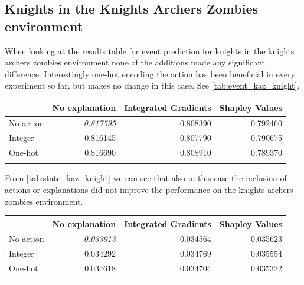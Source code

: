 \documentclass[UKenglish]{uiomasterthesis}
\begin{document}
\subsection{Knights in the Knights Archers Zombies environment}

When looking at the results table for event prediction for knights in the knights archers zombies environment none of the additions made any significant difference. Interestingly one-hot encoding the action has been beneficial in every experiment so far, but makes no change in this case. See \cref{tab:event_kaz_knight}.

\begin{center}
\label{tab:event_kaz_knight}
\begin{tabular}{lrrr}
\toprule
 & No explanation & Integrated Gradients & Shapley Values \\
\midrule
No action & \textit{0.817595} & 0.808390 & 0.792460 \\
Integer & 0.816145 & 0.807790 & 0.790675 \\
One-hot & 0.816690 & 0.808910 & 0.789370 \\ 
\bottomrule
\addlinespace[2pt]
\multicolumn{3}{l}{\textsuperscript{***}$p<0.001$, 
  \textsuperscript{**}$p<0.01$, 
  \textsuperscript{*}$p<0.05$}
\end{tabular}
\end{center}

From \cref{tab:state_kaz_knight} we can see that also in this case the inclusion of actions or explanations did not improve the performance on the knights archers zombies environment.

\begin{center}
\label{tab:state_kaz_knight}
\begin{tabular}{lrrr}
\toprule
 & No explanation & Integrated Gradients & Shapley Values \\
\midrule
No action & \textit{0.033913} & 0.034564 & 0.035623 \\
Integer & 0.034292 & 0.034769 & 0.035554 \\
One-hot & 0.034618 & 0.034704 & 0.035322 \\
\bottomrule
\addlinespace[2pt]
\multicolumn{3}{l}{\textsuperscript{***}$p<0.001$, 
  \textsuperscript{**}$p<0.01$, 
  \textsuperscript{*}$p<0.05$}
\end{tabular}
\end{center}
\end{document}
